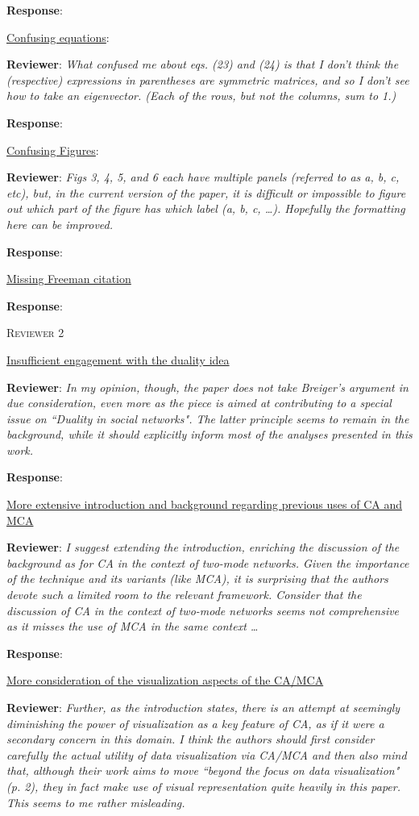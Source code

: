 \documentclass{article}
\begin{document}
\textbf{Response}:

\underline{Confusing equations}:

\textbf{Reviewer}: \textit{What confused me about eqs. (23) and (24) is that I don't think the (respective) expressions in parentheses are symmetric matrices, and so I don't see how to take an eigenvector. (Each of the rows, but not the columns, sum to 1.)}

\textbf{Response}:

\underline{Confusing Figures}:

\textbf{Reviewer}: \textit{Figs 3, 4, 5, and 6 each have multiple panels (referred to as a, b, c, etc), but, in the current version of the paper, it is difficult or impossible to figure out which part of the figure has which label (a, b, c, …). Hopefully the formatting here can be improved.}

\textbf{Response}:


\underline{Missing Freeman citation}

\textbf{Response}:

\newpage
\textsc{Reviewer 2}

\underline{Insufficient engagement with the duality idea}

\textbf{Reviewer}: \textit{In my opinion, though, the paper does not take Breiger's argument in due consideration, even more as the piece is aimed at contributing to a special issue on ``Duality in social networks". The latter principle seems to remain in the background, while it should explicitly inform most of the analyses presented in this work.}

\textbf{Response}:

\underline{More extensive introduction and background regarding previous uses of CA and MCA}

\textbf{Reviewer}: \textit{I suggest extending the introduction, enriching the discussion of the background as for CA in the context of two-mode networks. Given the importance of the technique and its variants (like MCA), it is surprising that the authors devote such a limited room to the relevant framework. Consider that the discussion of CA in the context of two-mode networks seems not comprehensive as it misses the use of MCA in the same context \ldots}

\textbf{Response}:

\underline{More consideration of the visualization aspects of the CA/MCA}

\textbf{Reviewer}: \textit{Further, as the introduction states, there is an attempt at seemingly diminishing the power of visualization as a key feature of CA, as if it were a secondary concern in this domain. I think the authors should first consider carefully the actual utility of data visualization via CA/MCA and then also mind that, although their work aims to move ``beyond the focus on data visualization" (p. 2), they in fact make use of visual representation quite heavily in this paper. This seems to me rather misleading.} 
\end{document}
